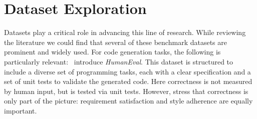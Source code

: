 \section{Dataset Exploration}
Datasets play a critical role in advancing this line of research. While reviewing the literature we could find that several of these benchmark datasets are prominent and widely used. For code generation tasks, the following is particularly relevant:~\cite{chen2021evaluating} introduce \emph{HumanEval}. This dataset is structured to include a diverse set of programming tasks, each with a clear specification and a set of unit tests to validate the generated code. Here correctness is not measured by human input, but is tested via unit tests. However, \citet{fu2023gptscore} stress that correctness is only part of the picture: requirement satisfaction and style adherence are equally important.